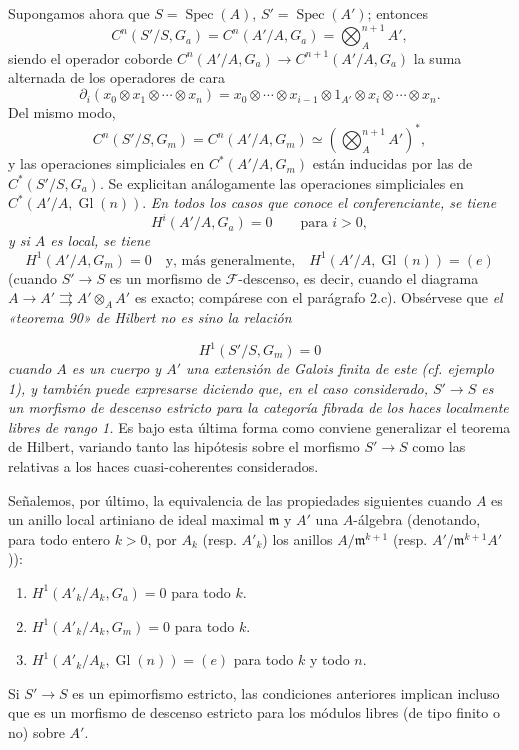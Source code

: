 \documentclass[11pt,twoside,openany]{book}
\numberwithin{equation}{section}
\newcommand{\src}[1]{%
  \phantomsection\hypertarget{src:#1}{}%
  \marginpar{\raggedleft\footnotesize\sffamily #1}%
}
\theoremstyle{plain}
\theoremstyle{definition}
\theoremstyle{remark}
\newcommand{\FgaUnitKey}{frontmatter}
\renewcommand{\src}[1]{%
  \phantomsection\hypertarget{src:\FgaUnitKey:#1}{}%
  \marginpar{\raggedleft\footnotesize\sffamily #1}%
}
\theoremstyle{plain}
\theoremstyle{definition}
\theoremstyle{remark}
\begin{document}
Supongamos ahora que $S=\operatorname{Spec}(A)$,
$S'=\operatorname{Spec}(A')$; entonces
\[
  C^n(S'/S,G_a)=C^n(A'/A,G_a)=\bigotimes_A^{n+1}A',
\]
siendo el operador coborde
$C^n(A'/A,G_a)\longrightarrow C^{n+1}(A'/A,G_a)$ la suma alternada de los
operadores de cara
\[
  \partial_i(x_0\otimes x_1\otimes\cdots\otimes x_n)
  =x_0\otimes\cdots\otimes x_{i-1}\otimes1_{A'}\otimes
   x_i\otimes\cdots\otimes x_n.
\]
Del mismo modo,
\[
  C^n(S'/S,G_m)=C^n(A'/A,G_m)
  \simeq\left(\bigotimes_A^{n+1}A'\right)^*,
\]
y las operaciones simpliciales en $C^*(A'/A,G_m)$ están inducidas por las de
$C^*(S'/S,G_a)$. Se explicitan análogamente las operaciones simpliciales en
$C^*(A'/A,\operatorname{Gl}(n))$. \emph{En todos los casos que conoce el
conferenciante, se tiene}
\[
  H^i(A'/A,G_a)=0\qquad\text{para $i>0$},
\]
\emph{y si $A$ es local, se tiene}
\[
  H^1(A'/A,G_m)=0
  \quad\text{y, más generalmente,}\quad
  H^1(A'/A,\operatorname{Gl}(n))=(e)
\]
(cuando $S'\longrightarrow S$ es un morfismo de $\mathcal F$-descenso, es
decir, cuando el diagrama
$A\longrightarrow A'\rightrightarrows A'\otimes_AA'$ es exacto; compárese con
el parágrafo 2.c). Obsérvese que \emph{el «teorema 90» de Hilbert no es sino
la relación}
\src{314}
\[
  H^1(S'/S,G_m)=0
\]
\emph{cuando $A$ es un cuerpo y $A'$ una extensión de Galois finita de este
(cf. ejemplo 1), y también puede expresarse diciendo que, en el caso
considerado, $S'\longrightarrow S$ es un morfismo de descenso estricto para la
categoría fibrada de los haces localmente libres de rango 1.} Es bajo esta
última forma como conviene generalizar el teorema de Hilbert, variando tanto
las hipótesis sobre el morfismo $S'\longrightarrow S$ como las relativas a los
haces cuasi-coherentes considerados.

Señalemos, por último, la equivalencia de las propiedades siguientes cuando
$A$ es un anillo local artiniano de ideal maximal $\mathfrak m$ y $A'$ una
$A$-álgebra (denotando, para todo entero $k>0$, por $A_k$ (resp. $A'_k$) los
anillos $A/\mathfrak m^{k+1}$ (resp. $A'/\mathfrak m^{k+1}A'$)):
\begin{enumerate}
\item[(i)] $H^1(A'_k/A_k,G_a)=0$ para todo $k$.
\item[(ii)] $H^1(A'_k/A_k,G_m)=0$ para todo $k$.
\item[(iii)] $H^1(A'_k/A_k,\operatorname{Gl}(n))=(e)$ para todo $k$ y todo
$n$.
\end{enumerate}
Si $S'\longrightarrow S$ es un epimorfismo estricto, las condiciones
anteriores implican incluso que es un morfismo de descenso estricto para los
módulos libres (de tipo finito o no) sobre $A'$.
\end{document}
